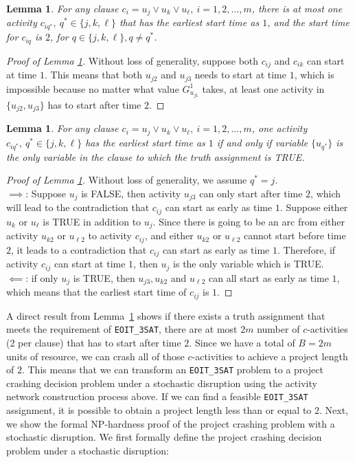 \documentclass[11pt]{article}
\newtheorem{lemma}[theorem]{Lemma}
\newcommand{\noi}{\noindent}
\begin{document}
		\begin{lemma} \label{lemma:onlyOne}
			For any clause \(c_i = u_j \vee u_k \vee u_\ell,\ i = 1,2,\dots,m\), there is at most one activity \(c_{iq^*},\ q^* \in \{j,k,\ell\}\) that has the earliest start time as \(1\), and the start time for \(c_{iq}\) is \(2\), for \(q \in \{j,k,\ell\}, q \neq q^*\).
		\end{lemma}
		\begin{proof}[Proof of Lemma \ref{lemma:onlyOne}]
			Without loss of generality, suppose both \(c_{ij}\) and \(c_{ik}\) can start at time \(1\). This means that both \(u_{j2}\) and \(u_{j3}\) needs to start at time \(1\), which is impossible because no matter what value \(G^1_{u_{j1}}\) takes, at least one activity in \(\{u_{j2},u_{j3}\}\) has to start after time \(2\).
		\end{proof}
		\begin{lemma} \label{lemma:iff}
			For any clause \(c_i = u_j \vee u_k \vee u_\ell,\ i = 1,2,\dots,m\), one activity \(c_{iq^*},\ q^* \in \{j,k,\ell\}\) has the earliest start time as \(1\) if and only if variable \(\{u_{q^*}\}\) is the only variable in the clause to which the truth assignment is TRUE.
		\end{lemma}
		\begin{proof}[Proof of Lemma \ref{lemma:iff}]
			Without loss of generality, we assume \(q^* = j\).\\
			\(\implies\):  Suppose \(u_j\) is FALSE, then activity \(u_{j3}\) can only start after time \(2\), which will lead to the contradiction that \(c_{ij}\) can start as early as time \(1\). Suppose either \(u_k\) or \(u_\ell\) is TRUE in addition to \(u_j\). Since there is going to be an arc from either activity \(u_{k2}\) or \(u_{\ell 2}\) to activity \(c_{ij}\), and either \(u_{k2}\) or \(u_{\ell 2}\) cannot start before time \(2\), it leads to a contradiction that \(c_{ij}\) can start as early as time \(1\). Therefore, if activity \(c_{ij}\) can start at time \(1\), then \(u_j\) is the only variable which is TRUE.\\
			\(\impliedby\): if only \(u_j\) is TRUE, then \(u_{j3}, u_{k2}\) and \(u_{\ell 2}\) can all start as early as time \(1\), which means that the earliest start time of \(c_{ij}\) is \(1\).
		\end{proof}
		\noi A direct result from Lemma~\ref{lemma:iff} shows if there exists a truth assignment that meets the requirement of \verb|EOIT_3SAT|, there are at most \(2m\) number of \(c\)-activities (2 per clause) that has to start after time \(2\). Since we have a total of \(B = 2m\) units of resource, we can crash all of those \(c\)-activities to achieve a project length of \(2\). This means that we can transform an \verb|EOIT_3SAT| problem to a project crashing decision problem under a stochastic disruption using the activity network construction process above. If we can find a feasible \verb|EOIT_3SAT| assignment, it is possible to obtain a project length less than or equal to 2. Next, we show the formal NP-hardness proof of the project crashing problem with a stochastic disruption. We first formally define the project crashing decision problem under a stochastic disruption:
\end{document}
